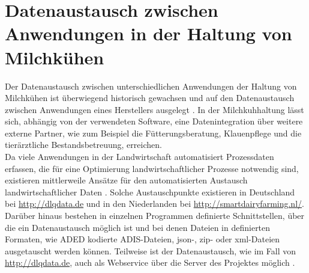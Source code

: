 	


\section{Datenaustausch zwischen Anwendungen in der Haltung von Milchkühen}
Der Datenaustausch zwischen unterschiedlichen Anwendungen der Haltung von Milchkühen ist überwiegend historisch gewachsen und auf den Datenaustausch zwischen Anwendungen eines Herstellers ausgelegt \autocite[16]{schulze_c._hybride_2008}. In der Milchkuhhaltung lässt sich, abhängig von der verwendeten Software, eine Datenintegration über weitere externe Partner, wie zum Beispiel die Fütterungsberatung, Klauenpflege und die tierärztliche Bestandsbetreuung, erreichen.\\
Da viele Anwendungen in der Landwirtschaft automatisiert Prozessdaten erfassen, die für eine Optimierung landwirtschaftlicher Prozesse notwendig sind, existieren mittlerweile Ansätze für den automatisierten Austausch landwirtschaftlicher Daten \autocite{dlqdata_dlq_????}.
Solche Austauschpunkte existieren in Deutschland bei \url{http://dlqdata.de} und in den Niederlanden bei \url{http://smartdairyfarming.nl/}. Darüber hinaus bestehen in einzelnen Programmen definierte Schnittstellen, über die ein Datenaustausch möglich ist und bei denen Dateien in definierten Formaten, wie ADED kodierte ADIS-Dateien, json-, zip- oder xml-Dateien ausgetauscht werden können.
Teilweise ist der Datenaustausch, wie im Fall von \url{http://dlqdata.de}, auch als Webservice über die Server des Projektes möglich \autocite{dlqdata_dlq_????-1}. 